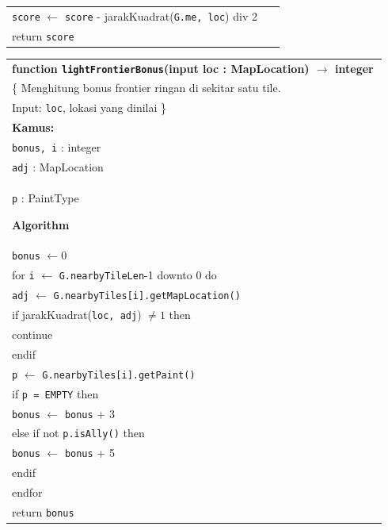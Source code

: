 \documentclass{article}
\newenvironment{pseudobox}
{
\centering
\begin{longtable}{|p{0.94\linewidth}|}
\hline
}
{
\\ \hline
\end{longtable}
\vspace{0.05cm}
}
\begin{document}
\begin{enumerate}[label=\alph*.]
\begin{enumerate}[label=\alph*.]
\begin{pseudobox}
\hspace*{1.5em}\texttt{score} $\leftarrow$ \texttt{score} - jarakKuadrat(\texttt{G.me, loc}) div 2 \\
\hspace*{1.5em}return \texttt{score}
\end{pseudobox}

\begin{pseudobox}
\textbf{function \texttt{lightFrontierBonus}(input loc : MapLocation) $\rightarrow$ integer} \\
\{ Menghitung bonus frontier ringan di sekitar satu tile. \\
Input: \texttt{loc}, lokasi yang dinilai
\} \\

\textbf{Kamus:} \\
\hspace*{1.5em}\texttt{bonus, i} : integer \\
\hspace*{1.5em}\texttt{adj} : MapLocation \\
\hspace*{1.5em}\texttt{p} : PaintType

\textbf{Algorithm} \\
\hspace*{1.5em}\texttt{bonus} $\leftarrow 0$ \\
\hspace*{1.5em}for \texttt{i} $\leftarrow$ \texttt{G.nearbyTileLen}-1 downto 0 do \\
\hspace*{3em}\texttt{adj} $\leftarrow$ \texttt{G.nearbyTiles[i].getMapLocation()} \\
\hspace*{3em}if jarakKuadrat(\texttt{loc, adj}) $\neq 1$ then \\
\hspace*{4.5em}continue \\
\hspace*{3em}endif \\

\hspace*{3em}\texttt{p} $\leftarrow$ \texttt{G.nearbyTiles[i].getPaint()} \\
\hspace*{3em}if \texttt{p = EMPTY} then \\
\hspace*{4.5em}\texttt{bonus} $\leftarrow$ \texttt{bonus} + 3 \\
\hspace*{3em}else if not \texttt{p.isAlly()} then \\
\hspace*{4.5em}\texttt{bonus} $\leftarrow$ \texttt{bonus} + 5 \\
\hspace*{3em}endif \\
\hspace*{1.5em}endfor \\
\hspace*{1.5em}return \texttt{bonus}
\end{pseudobox}


\end{enumerate}
\end{enumerate}
\end{document}
